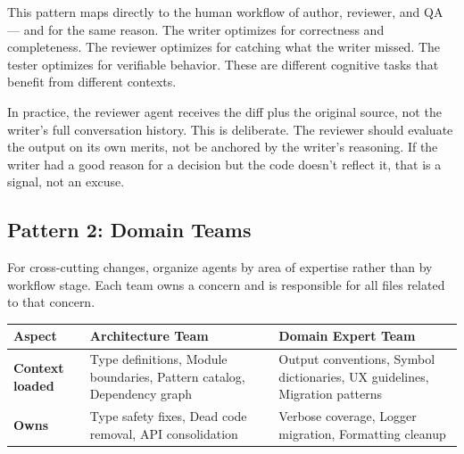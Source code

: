 \documentclass[
  a4paper,
  DIV=11,
  numbers=noendperiod]{scrreprt}
\newcounter{none} %
\begin{document}
This pattern maps directly to the human workflow of author, reviewer,
and QA --- and for the same reason. The writer optimizes for correctness
and completeness. The reviewer optimizes for catching what the writer
missed. The tester optimizes for verifiable behavior. These are
different cognitive tasks that benefit from different contexts.

In practice, the reviewer agent receives the diff plus the original
source, not the writer's full conversation history. This is deliberate.
The reviewer should evaluate the output on its own merits, not be
anchored by the writer's reasoning. If the writer had a good reason for
a decision but the code doesn't reflect it, that is a signal, not an
excuse.

\subsection{Pattern 2: Domain Teams}\label{pattern-2-domain-teams}

For cross-cutting changes, organize agents by area of expertise rather
than by workflow stage. Each team owns a concern and is responsible for
all files related to that concern.

{\def\LTcaptype{none} %
\begin{longtable}[]{@{}
  >{\raggedright\arraybackslash}p{}
  >{\raggedright\arraybackslash}p{}
  >{\raggedright\arraybackslash}p{}@{}}
\toprule\noalign{}
\begin{minipage}[b]{\linewidth}\raggedright
Aspect
\end{minipage} & \begin{minipage}[b]{\linewidth}\raggedright
Architecture Team
\end{minipage} & \begin{minipage}[b]{\linewidth}\raggedright
Domain Expert Team
\end{minipage} \\
\midrule\noalign{}
\endhead
\bottomrule\noalign{}
\endlastfoot
\textbf{Context loaded} & Type definitions, Module boundaries, Pattern
catalog, Dependency graph & Output conventions, Symbol dictionaries, UX
guidelines, Migration patterns \\
\textbf{Owns} & Type safety fixes, Dead code removal, API consolidation
& Verbose coverage, Logger migration, Formatting cleanup \\
\end{longtable}
}
\end{document}
